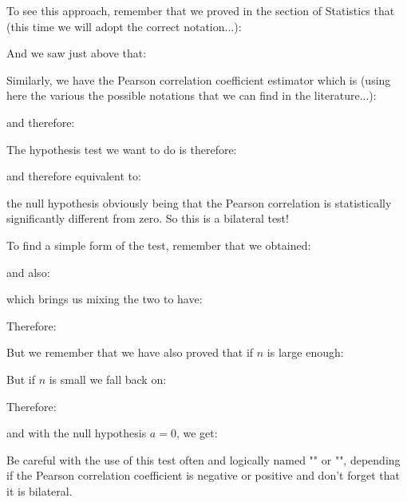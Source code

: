 	To see this approach, remember that we proved in the section of Statistics that (this time we will adopt the correct notation...):
	
	And we saw just above that:
	
	Similarly, we have the Pearson correlation coefficient estimator which is (using here the various the possible notations that we can find in the literature...):
	
	and therefore:
	
	The hypothesis test we want to do is therefore:
	
	and therefore equivalent to:
	
	the null hypothesis obviously being that the Pearson correlation is statistically significantly different from zero. So this is a bilateral test!
	
	To find a simple form of the test, remember that we obtained:
	
	and also:
	
	which brings us mixing the two to have:
	
	Therefore:
	
	But we remember that we have also proved that if $n$ is large enough:
	
	But if $n$ is small we fall back on:
	
	Therefore:
	
	and with the null hypothesis $a=0$, we get:
	
	
	Be careful with the use of this test often and logically named "" or "", depending if the Pearson correlation coefficient is negative or positive and don't forget that it is bilateral.
	
